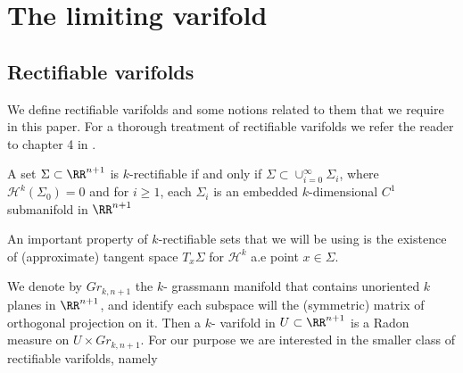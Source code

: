 \section{The limiting varifold}

\subsection{Rectifiable varifolds } We define rectifiable varifolds and  some notions related to them that we require in this paper. For a thorough treatment of rectifiable varifolds we refer the reader to chapter 4 in \cite{si}.
\begin{defi}
A set $\Sigma \subset \RR^{n+1}$ is $k$-rectifiable if and only if $\Sigma \subset \cup_{i=0}^{\infty} \Sigma_i$, where $\mathcal{H}^k(\Sigma_0)=0$ and for $i\geq 1$, each $\Sigma_i$ is an embedded $k$-dimensional  $C^1$ submanifold in $\RR^{n+1}$ \end{defi}

\begin{rem}
    An important property of $k$-rectifiable sets that we will be using is the existence of (approximate) tangent space $T_x \Sigma$ for $\mathcal{H}^k$ a.e point $x \in \Sigma$.
\end{rem}

We denote by $Gr_{k,n+1}$ the $k$- grassmann manifold that contains unoriented $k$ planes in $\RR^{n+1}$, and identify each subspace will the (symmetric) matrix of orthogonal projection on it. Then a $k$- varifold in $U \subset \RR^{n+1}$ is a Radon measure on $U \times Gr_{k,n+1}$. For our purpose we are interested in the smaller class of rectifiable varifolds, namely

